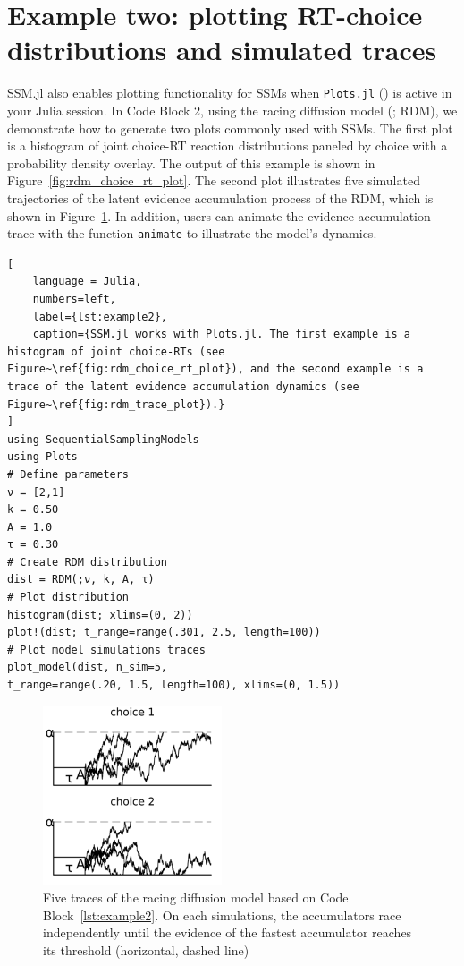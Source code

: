 \documentclass{juliacon}
\begin{document}

\section{Example two: plotting RT-choice distributions and simulated traces}

SSM.jl also enables plotting functionality for SSMs when \verb|Plots.jl| (\cite{PlotsJL}) is active in your Julia session. In Code Block 2, using the racing diffusion model (\cite{tillman2020sequential}; RDM), we demonstrate how to generate two plots commonly used with SSMs. The first plot is a histogram of joint choice-RT reaction distributions paneled by choice with a probability density overlay. The output of this example is shown in Figure~\ref{fig:rdm_choice_rt_plot}. The second plot illustrates five simulated trajectories of the latent evidence accumulation process of the RDM, which is shown in Figure~\ref{fig:rdm_trace_plot}. In addition, users can animate the evidence accumulation trace with the function \verb|animate| to illustrate the model's dynamics.

\begin{lstlisting}[
    language = Julia, 
    numbers=left, 
    label={lst:example2},  
    caption={SSM.jl works with Plots.jl. The first example is a histogram of joint choice-RTs (see Figure~\ref{fig:rdm_choice_rt_plot}), and the second example is a trace of the latent evidence accumulation dynamics (see Figure~\ref{fig:rdm_trace_plot}).}
]
using SequentialSamplingModels
using Plots
# Define parameters
ν = [2,1]
k = 0.50
A = 1.0
τ = 0.30
# Create RDM distribution
dist = RDM(;ν, k, A, τ)
# Plot distribution
histogram(dist; xlims=(0, 2))
plot!(dist; t_range=range(.301, 2.5, length=100))
# Plot model simulations traces
plot_model(dist, n_sim=5, 
t_range=range(.20, 1.5, length=100), xlims=(0, 1.5))

\end{lstlisting}

\begin{figure}[!htp]
\includegraphics[height=200px,width=200px]{paper/figures/rdm_trace_plot.png}
 \caption{Five traces of the racing diffusion model based on Code Block~\ref{lst:example2}. On each simulations, the accumulators race independently until the evidence of the fastest accumulator reaches its threshold (horizontal, dashed line)} 
 \label{fig:rdm_trace_plot}
\end{figure}
\end{document}
